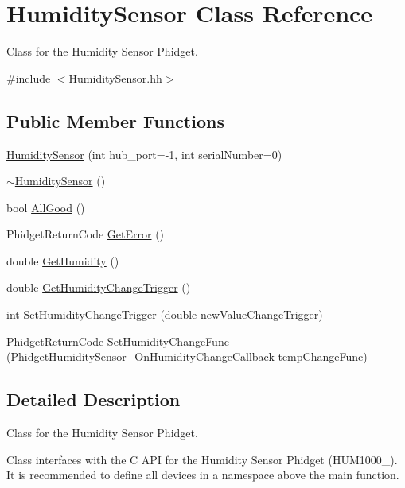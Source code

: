 \hypertarget{classHumiditySensor}{}\section{Humidity\+Sensor Class Reference}
\label{classHumiditySensor}


Class for the Humidity Sensor Phidget.  




{\ttfamily \#include $<$Humidity\+Sensor.\+hh$>$}

\subsection*{Public Member Functions}
\begin{DoxyCompactItemize}
\item 
\hyperlink{classHumiditySensor_a5e199091caca19235543cd9e55493566}{Humidity\+Sensor} (int hub\+\_\+port=-\/1, int serial\+Number=0)
\item 
\hyperlink{classHumiditySensor_a7c176f946d95e90b4f9aabbdbbd90874}{$\sim$\+Humidity\+Sensor} ()
\item 
bool \hyperlink{classHumiditySensor_a5ac9e8fc8d6fc1e78463ce8a7ceae54e}{All\+Good} ()
\item 
Phidget\+Return\+Code \hyperlink{classHumiditySensor_aa425c22d068e39da7df26f473499dd37}{Get\+Error} ()
\item 
double \hyperlink{classHumiditySensor_aea4b9c30bd7fd630b98b80eea609030e}{Get\+Humidity} ()
\item 
double \hyperlink{classHumiditySensor_a9bf5c13ab0c29b42fe7bc2fc0edde7ee}{Get\+Humidity\+Change\+Trigger} ()
\item 
int \hyperlink{classHumiditySensor_aedd8316be052bfbda8b882b61ad46a0b}{Set\+Humidity\+Change\+Trigger} (double new\+Value\+Change\+Trigger)
\item 
Phidget\+Return\+Code \hyperlink{classHumiditySensor_a8ceff441668925dab38fecb150879160}{Set\+Humidity\+Change\+Func} (Phidget\+Humidity\+Sensor\+\_\+\+On\+Humidity\+Change\+Callback temp\+Change\+Func)
\end{DoxyCompactItemize}


\subsection{Detailed Description}
Class for the Humidity Sensor Phidget. 

Class interfaces with the C A\+PI for the Humidity Sensor Phidget (H\+U\+M1000\+\_). It is recommended to define all devices in a namespace above the main function. 


